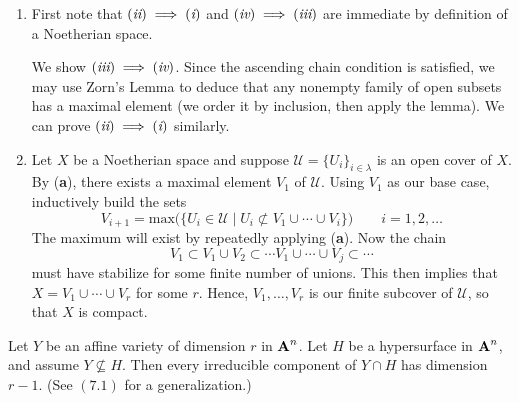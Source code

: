 \documentclass[10pt]{amsart}
\begin{document}
\begin{solution}
    \begin{luke}
        \begin{enumerate}
            \item First note that $(\emph{ii}) \implies (\emph{i})$ and $(\emph{iv}) \implies (\emph{iii})$ 
            are immediate by definition of a Noetherian space.
            
            We show $(\emph{iii}) \implies (\emph{iv})$. Since the ascending chain condition is satisfied, 
            we may use Zorn's Lemma to deduce that any nonempty family of open subsets has 
            a maximal element (we order it by inclusion, then apply the lemma).
            We can prove $(\emph{ii}) \implies (\emph{i})$ similarly.
        
            \item Let $X$ be a Noetherian space and suppose $\mathcal{U} = \{U_{i}\}_{i \in \lambda}$ 
            is an open cover of $X$. 
            By (\textbf{a}), there exists a maximal element $V_1$ of $\mathcal{U}$. Using 
            $V_1$ as our base case, inductively build the sets 
            \[
                V_{i+1} = \text{max}\bigg(\bigg\{ U_i \in \mathcal{U} \;\bigg|\; U_i \not\subset V_1 \cup \cdots \cup V_{i}  \bigg\}\bigg) \qquad i = 1, 2, \dots
            \]
            The maximum will exist by repeatedly applying (\textbf{a}). Now the chain 
            \[
                V_1 \subset V_1 \cup V_2 \subset \cdots V_1 \cup \cdots \cup V_j \subset \cdots
            \]
            must have stabilize for some finite number of unions. This then implies that 
            $X = V_1 \cup \cdots \cup V_r$ for some $r$. Hence, $V_1, \dots, V_r$ is our finite 
            subcover of $\mathcal{U}$, so that $X$ is compact.
    
        \end{enumerate}
    \end{luke}
\end{solution}

\begin{exercise}[1.8]
    Let $Y$ be an affine variety of dimension $r$ in $\aa^n$.
    Let $H$ be a hypersurface in $\aa^n$, and assume $Y \not\subseteq H$.
    Then every irreducible component of $Y \cap H$ has dimension $r-1$.
    (See $(7.1)$ for a generalization.)
\end{exercise}
\end{document}
